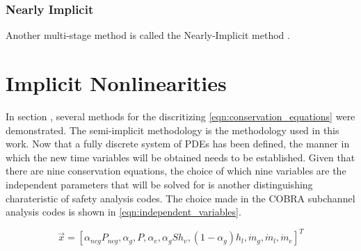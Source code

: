 \subsubsection{Nearly Implicit}
\label{subsubsect:numerics_nearly_implicit}
Another multi-stage method is called the Nearly-Implicit method \cite{Trapp1986}.
\section{Implicit Nonlinearities}
\label{sect:nonlinearities}
In section , several methods for the discritizing \eqref{eqn:conservation_equations} were demonstrated.
The semi-implicit methodology is the methodology used in this work.
Now that a fully discrete system of PDEs has been defined, the manner in which the new time variables will be obtained needs to be established.
Given that there are nine conservation equations, the choice of which nine variables are the independent parameters that will be solved for is another distinguishing charateristic of safety analysis codes.
The choice made in the COBRA subchannel analysis codes is shown in \eqref{eqn:independent_variables}.

\begin{equation}
\label{eqn:independent_variables}
\vec{x} = [\alpha_{ncg}P_{ncg}, \alpha_g, P, \alpha_e, \alpha_gS h_v, (1 - \alpha_g) h_l, \dot{m}_g, \dot{m}_l, \dot{m}_e]^{T}
\end{equation}

